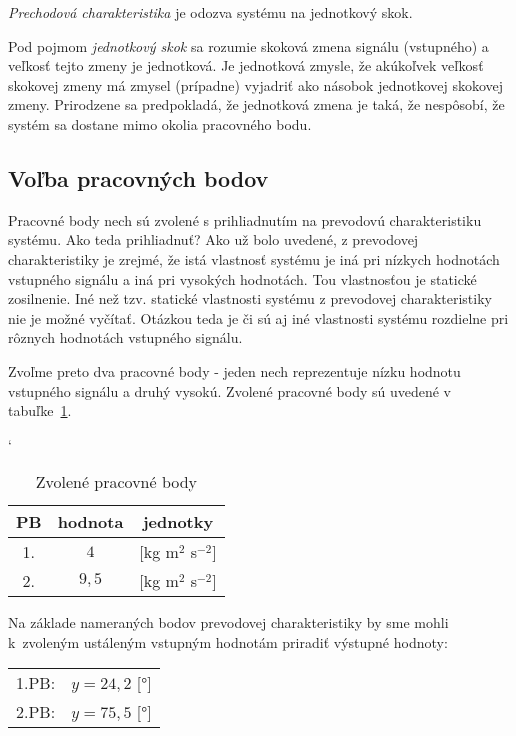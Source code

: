 \documentclass[a4paper, 10pt, ]{article}
\begin{document}
\emph{Prechodová charakteristika} je odozva systému na jednotkový skok.

Pod pojmom \emph{jednotkový skok} sa rozumie skoková zmena signálu (vstupného) a veľkosť tejto zmeny je jednotková. Je jednotková zmysle, že akúkoľvek veľkosť skokovej zmeny má zmysel (prípadne) vyjadriť ako násobok jednotkovej skokovej zmeny. Prirodzene sa predpokladá, že jednotková zmena je taká, že nespôsobí, že systém sa dostane mimo okolia pracovného bodu.



\subsection{Voľba pracovných bodov}



Pracovné body nech sú zvolené s prihliadnutím na prevodovú charakteristiku systému. Ako teda prihliadnuť? Ako už bolo uvedené, z prevodovej charakteristiky je zrejmé, že istá vlastnosť systému je iná pri nízkych hodnotách vstupného signálu a iná pri vysokých hodnotách. Tou vlastnosťou je statické zosilnenie. Iné než tzv. statické vlastnosti systému z prevodovej charakteristiky nie je možné vyčítať. Otázkou teda je či sú aj iné vlastnosti systému rozdielne pri rôznych hodnotách vstupného signálu.


Zvoľme preto dva pracovné body - jeden nech reprezentuje nízku hodnotu vstupného signálu a druhý vysokú. Zvolené pracovné body sú uvedené v tabuľke~\ref{Zvolené pracovné body}.


\begin{table}[!ht]
    \centering
	\catcode`

    \caption{Zvolené pracovné body}
    \label{Zvolené pracovné body}

    \begin{tabular}{ccc}
        \toprule
        PB & hodnota & jednotky \\
        \midrule
        1. & $4$ & [kg m$^2$ s$^{-2}$] \\
        2. & $9,5$ & [kg m$^2$ s$^{-2}$] \\
        \bottomrule
    \end{tabular}

\end{table}


Na základe nameraných bodov prevodovej charakteristiky by sme mohli k~zvoleným ustáleným vstupným hodnotám priradiť výstupné hodnoty:

\noindent
\begin{tabular}{@{}l l}
    1.PB: & $y=24,2$ [°] \\
    2.PB: & $y=75,5$ [°]
\end{tabular}
\end{document}
